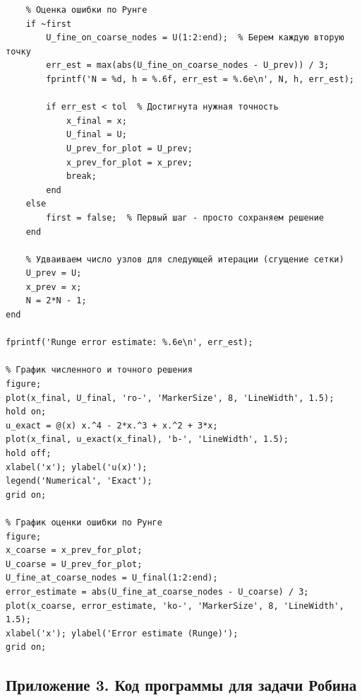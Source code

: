 \documentclass[14pt,a4paper]{extarticle}  %
\numberwithin{equation}{section}
\begin{document}
\begin{verbatim}
    % Оценка ошибки по Рунге 
    if ~first
        U_fine_on_coarse_nodes = U(1:2:end);  % Берем каждую вторую точку
        err_est = max(abs(U_fine_on_coarse_nodes - U_prev)) / 3;
        fprintf('N = %d, h = %.6f, err_est = %.6e\n', N, h, err_est);

        if err_est < tol  % Достигнута нужная точность
            x_final = x;
            U_final = U;
            U_prev_for_plot = U_prev;
            x_prev_for_plot = x_prev;
            break;
        end
    else
        first = false;  % Первый шаг - просто сохраняем решение
    end

    % Удваиваем число узлов для следующей итерации (сгущение сетки)
    U_prev = U;
    x_prev = x;
    N = 2*N - 1;
end

fprintf('Runge error estimate: %.6e\n', err_est);

% График численного и точного решения
figure;
plot(x_final, U_final, 'ro-', 'MarkerSize', 8, 'LineWidth', 1.5);
hold on;
u_exact = @(x) x.^4 - 2*x.^3 + x.^2 + 3*x;
plot(x_final, u_exact(x_final), 'b-', 'LineWidth', 1.5);
hold off;
xlabel('x'); ylabel('u(x)');
legend('Numerical', 'Exact');
grid on;

% График оценки ошибки по Рунге
figure;
x_coarse = x_prev_for_plot;
U_coarse = U_prev_for_plot;
U_fine_at_coarse_nodes = U_final(1:2:end);
error_estimate = abs(U_fine_at_coarse_nodes - U_coarse) / 3;
plot(x_coarse, error_estimate, 'ko-', 'MarkerSize', 8, 'LineWidth', 1.5);
xlabel('x'); ylabel('Error estimate (Runge)');
grid on;
\end{verbatim}

\subsection*{Приложение 3. Код программы для задачи Робина}
\label{app:robin}
\end{document}
